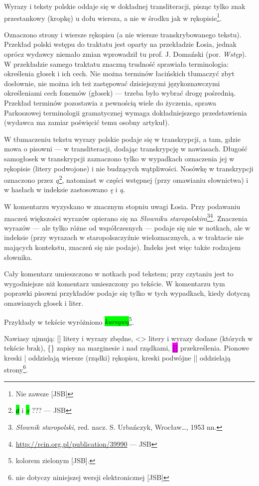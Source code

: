 \documentclass[dvipsnames,12pt]{report}
\newcommand{\parkosz}[1]{\index{#1}\colorbox{lime}{\textit{\Quivira #1}}}
\newcommand{\margin}[1]{\colorbox{blue!10}{\{#1\}}}
\newcommand{\add}[1]{\colorbox{olive!10}{<#1>}}
\newcommand{\extra}[1]{\colorbox{magenta!10}{[#1]}}
\newcommand{\overstr}[1]{\colorbox{magenta}{{\Quivira⟦}#1{\Quivira⟧}}}
\begin{document}
Wyrazy i teksty polskie oddaje się w dokładnej transliteracji, pisząc
tylko znak przestankowy (kropkę) u dołu wiersza, a nie w środku jak w
rękopisie\footnote{Nie zawsze [JSB]}.

Oznaczono strony i wiersze rękopisu (a nie wiersze transkrybowanego
tekstu).  Przekład polski wstępu do traktatu jest oparty na
przekładzie Łosia, jednak oprócz wydawcy niemało zmian wprowadził tu
prof. J. Domański (por. \textit{Wstęp}). W przekładzie samego traktatu
znaczną trudność sprawiała terminologia: określenia głosek i ich
cech. Nie można terminów łacińskich tłumaczyć zbyt dosłownie, nie
można ich też zastępować dzisiejszymi językoznawczymi określeniami
cech fonemów (głosek) — trzeba było wybrać drogę pośrednią. Przekład
terminów pozostawia z pewnością wiele do życzenia, sprawa Parkoszowej
terminologii gramatycznej wymaga dokładniejszego przedstawienia
(wydawca ma zamiar poświęcić temu osobny artykuł).

W tłumaczeniu tekstu wyrazy polskie podaje się w transkrypcji, a tam,
gdzie mowa o pisowni — w transliteracji, dodając transkrypcję w
nawiasach. Długość samogłosek w transkrypcji zaznaczono tylko w
wypadkach oznaczenia jej w rękopisie (litery podwojone) i nie
budzących wątpliwości. Nosówkę w transkrypcji oznaczono przez
\textit{ą}\footnote{\parkosz{ⱥ} i \parkosz{ø} ??? --- JSB}, natomiast
w części wstępnej (przy omawianiu słownictwa) i w hasłach w indeksie
zastosowano \textit{ę} i \textit{ą}.

W komentarzu wyzyskano w znacznym stopniu uwagi Łosia.  Przy podawaniu
znaczeń większości wyrazów opierano się na \textit{Słowniku
  staropolskim}\footnote{\textit{Słownik staropolski},
  red. nacz. S. Urbańczyk, Wrocław\ldots, 1953
  nn.}\footnote{\url{http://rcin.org.pl/publication/39990} ---
  JSB}. Znaczenia wyrazów — ale tylko różne od współczesnych — podaje
się nie w notkach, ale w indeksie (przy wyrazach w staropolszczyźnie
wieloznacznych, a w traktacie nie mających kontekstu, znaczeń się nie
podaje). Indeks jest więc także rodzajem słownika.


Cały komentarz umieszczono w notkach pod tekstem; przy
czytaniu jest to wygodniejsze niż komentarz umieszczony po tekście. W
komentarzu tym poprawki pisowni przykładów podaje się tylko w tych
wypadkach, kiedy dotyczą omawianych głosek i liter.

Przykłady w tekście wyróżniono \parkosz{kursywą}\footnote{kolorem
  zielonym [JSB].}.

Nawiasy ujmują: \extra{} litery i wyrazy zbędne, \add{} litery i wyrazy
dodane (których w tekście brak), \margin{} zapisy na marginesie i nad
rządkami, \overstr{} przekreślenia. Pionowe kreski | oddzielają
wiersze (rządki) rękopisu, kreski podwójne || oddzielają
strony\footnote{nie dotyczy niniejszej wersji elektronicznej [JSB]}.
\end{document}
